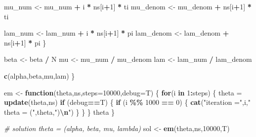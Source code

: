 \documentclass[
]{article}
\newenvironment{Shaded}{\begin{snugshade}}{\end{snugshade}}
\newcommand{\AttributeTok}[1]{\textcolor[rgb]{0.13,0.29,0.53}{#1}}
\newcommand{\CommentTok}[1]{\textcolor[rgb]{0.56,0.35,0.01}{\textit{#1}}}
\newcommand{\ControlFlowTok}[1]{\textcolor[rgb]{0.13,0.29,0.53}{\textbf{#1}}}
\newcommand{\DecValTok}[1]{\textcolor[rgb]{0.00,0.00,0.81}{#1}}
\newcommand{\FunctionTok}[1]{\textcolor[rgb]{0.13,0.29,0.53}{\textbf{#1}}}
\newcommand{\NormalTok}[1]{#1}
\newcommand{\OtherTok}[1]{\textcolor[rgb]{0.56,0.35,0.01}{#1}}
\newcommand{\SpecialCharTok}[1]{\textcolor[rgb]{0.81,0.36,0.00}{\textbf{#1}}}
\newcommand{\StringTok}[1]{\textcolor[rgb]{0.31,0.60,0.02}{#1}}
\begin{document}
\begin{Shaded}
\begin{Highlighting}[]
\NormalTok{    mu\_num }\OtherTok{\textless{}{-}}\NormalTok{ mu\_num }\SpecialCharTok{+}\NormalTok{ i }\SpecialCharTok{*}\NormalTok{ ns[i}\SpecialCharTok{+}\DecValTok{1}\NormalTok{] }\SpecialCharTok{*}\NormalTok{ ti}
\NormalTok{    mu\_denom }\OtherTok{\textless{}{-}}\NormalTok{ mu\_denom }\SpecialCharTok{+}\NormalTok{ ns[i}\SpecialCharTok{+}\DecValTok{1}\NormalTok{] }\SpecialCharTok{*}\NormalTok{ ti}
    
\NormalTok{    lam\_num }\OtherTok{\textless{}{-}}\NormalTok{ lam\_num }\SpecialCharTok{+}\NormalTok{ i }\SpecialCharTok{*}\NormalTok{ ns[i}\SpecialCharTok{+}\DecValTok{1}\NormalTok{] }\SpecialCharTok{*}\NormalTok{ pi}
\NormalTok{    lam\_denom }\OtherTok{\textless{}{-}}\NormalTok{ lam\_denom }\SpecialCharTok{+}\NormalTok{ ns[i}\SpecialCharTok{+}\DecValTok{1}\NormalTok{] }\SpecialCharTok{*}\NormalTok{ pi}
\NormalTok{  \}}
  
\NormalTok{  beta }\OtherTok{\textless{}{-}}\NormalTok{ beta }\SpecialCharTok{/}\NormalTok{ N}
\NormalTok{  mu }\OtherTok{\textless{}{-}}\NormalTok{ mu\_num }\SpecialCharTok{/}\NormalTok{ mu\_denom}
\NormalTok{  lam }\OtherTok{\textless{}{-}}\NormalTok{ lam\_num }\SpecialCharTok{/}\NormalTok{ lam\_denom}
  
  \FunctionTok{c}\NormalTok{(alpha,beta,mu,lam)}
\NormalTok{\}}

\NormalTok{em }\OtherTok{\textless{}{-}} \ControlFlowTok{function}\NormalTok{(theta,ns,}\AttributeTok{steps=}\DecValTok{10000}\NormalTok{,}\AttributeTok{debug=}\NormalTok{T)}
\NormalTok{\{}
  \ControlFlowTok{for}\NormalTok{(i }\ControlFlowTok{in} \DecValTok{1}\SpecialCharTok{:}\NormalTok{steps)}
\NormalTok{  \{}
\NormalTok{    theta }\OtherTok{=} \FunctionTok{update}\NormalTok{(theta,ns)}
    \ControlFlowTok{if}\NormalTok{ (debug}\SpecialCharTok{==}\NormalTok{T)}
\NormalTok{    \{}
      \ControlFlowTok{if}\NormalTok{ (i }\SpecialCharTok{\%\%} \DecValTok{1000} \SpecialCharTok{==} \DecValTok{0}\NormalTok{) \{ }\FunctionTok{cat}\NormalTok{(}\StringTok{"iteration ="}\NormalTok{,i,}\StringTok{" theta = ("}\NormalTok{,theta,}\StringTok{")\textquotesingle{}}\SpecialCharTok{\textbackslash{}n}\StringTok{"}\NormalTok{) \}}
\NormalTok{    \}}
\NormalTok{  \}}
\NormalTok{  theta}
\NormalTok{\}}

\CommentTok{\# solution theta = (alpha, beta, mu, lambda)}
\NormalTok{sol }\OtherTok{\textless{}{-}} \FunctionTok{em}\NormalTok{(theta,ns,}\DecValTok{10000}\NormalTok{,T)}
\end{Highlighting}
\end{Shaded}
\end{document}
